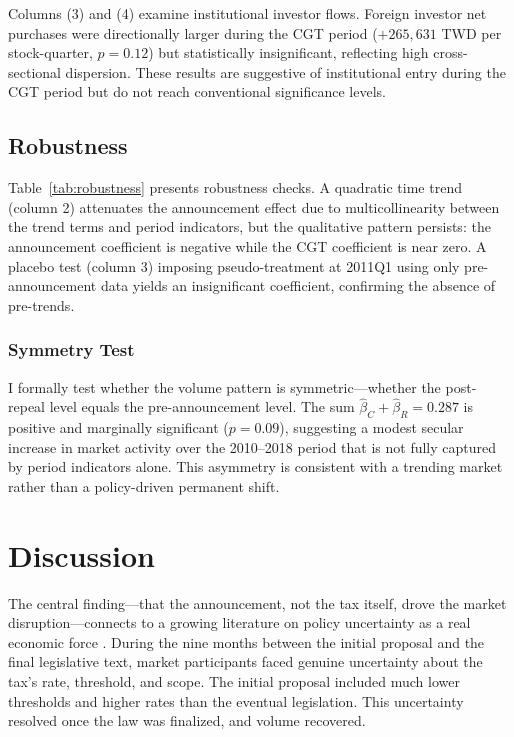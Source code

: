 \documentclass[12pt]{article}
\begin{document}
Columns (3) and (4) examine institutional investor flows. Foreign investor net purchases were directionally larger during the CGT period ($+265{,}631$ TWD per stock-quarter, $p = 0.12$) but statistically insignificant, reflecting high cross-sectional dispersion. These results are suggestive of institutional entry during the CGT period but do not reach conventional significance levels.


\subsection{Robustness}



Table~\ref{tab:robustness} presents robustness checks. A quadratic time trend (column 2) attenuates the announcement effect due to multicollinearity between the trend terms and period indicators, but the qualitative pattern persists: the announcement coefficient is negative while the CGT coefficient is near zero. A placebo test (column 3) imposing pseudo-treatment at 2011Q1 using only pre-announcement data yields an insignificant coefficient, confirming the absence of pre-trends.

\subsubsection*{Symmetry Test} I formally test whether the volume pattern is symmetric---whether the post-repeal level equals the pre-announcement level. The sum $\hat{\beta}_C + \hat{\beta}_R = 0.287$ is positive and marginally significant ($p = 0.09$), suggesting a modest secular increase in market activity over the 2010--2018 period that is not fully captured by period indicators alone. This asymmetry is consistent with a trending market rather than a policy-driven permanent shift.


\section{Discussion}

The central finding---that the announcement, not the tax itself, drove the market disruption---connects to a growing literature on policy uncertainty as a real economic force \citep{baker2016measuring}. During the nine months between the initial proposal and the final legislative text, market participants faced genuine uncertainty about the tax's rate, threshold, and scope. The initial proposal included much lower thresholds and higher rates than the eventual legislation. This uncertainty resolved once the law was finalized, and volume recovered.
\end{document}
